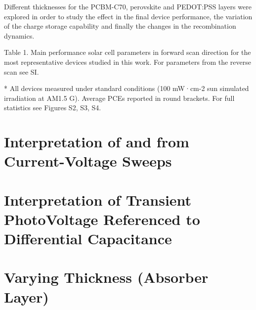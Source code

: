 Different thicknesses for the PCBM-C70, perovskite and PEDOT:PSS layers were explored in order to study the effect in the final device performance, the variation of the charge storage capability and finally the changes in the recombination dynamics.

Table 1. Main performance solar cell parameters in forward scan direction for the most representative devices studied in this work. For parameters from the reverse scan see SI.

* All devices measured under standard conditions (100 mW·cm-2 sun simulated irradiation at AM1.5 G). Average PCEs reported in round brackets. For full statistics see Figures S2, S3, S4.







\section{Interpretation of  and  from Current-Voltage Sweeps}

\section{Interpretation of Transient PhotoVoltage Referenced to Differential Capacitance}\label{interpretation_tpvdc}

\section{Varying  Thickness (Absorber Layer)}


